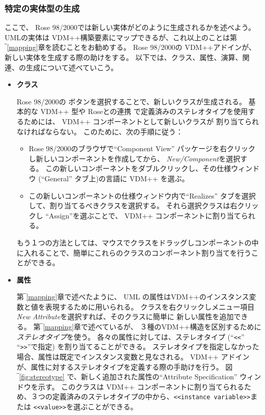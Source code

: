 \documentclass[\pformat,12pt]{jarticle}
\newcommand{\vdmpp}{VDM++}
\newcommand{\link}{Roseとの連携}
\newcommand{\rose}{Rose 98/2000}
\begin{document}
\subsubsection*{特定の実体型の生成}
  
ここで、 \rose{}では新しい実体がどのように生成されるかを述べよう。
UMLの実体は \vdmpp{}構築要素にマップできるが、これ以上のことは第‾\ref{mapping}章を読むことをお勧めする。
\rose{}の \vdmpp{}アドインが、新しい実体を生成する際の助けをする。
以下では、クラス、属性、演算、関連、の生成について述べていこう。

\begin{itemize}
\item{\bf クラス} 

\rose{}の ボタンを選択することで、新しいクラスが生成される。
基本的な \vdmpp{} 型や \link{} で定義済みのステレオタイプを使用するためには、 \vdmpp{} コンポーネントとして新しいクラスが 割り当てられなければならない。
このために、次の手順に従う：

  \begin{itemize}
  \item \rose{}のブラウザで``Component  View'' パッケージを右クリックし新しいコンポーネントを作成してから、 {\em  New/Component}を選択する。
この新しいコンポーネントをダブルクリックし、その仕様ウィンドウ (``General'' タブ上)の言語に \vdmpp{} を選ぶ。
  \item この新しいコンポーネントの仕様ウィンドウ内で``Realizes'' タブを選択して、割り当てるべきクラスを選択する。
それら選択クラスは右クリックし ``Assign''を選ぶことで、 \vdmpp{} コンポーネントに割り当てられる。
  \end{itemize}

もう１つの方法としては、マウスでクラスをドラッグしコンポーネントの中に入れることで、簡単にこれらのクラスのコンポーネント割り当てを行うことができる。

\item{\bf 属性}

 第‾\ref{mapping}章で述べたように、 UML の属性は\vdmpp{}のインスタンス変数と値を表現するために用いられる。
クラスを右クリックしメニュー項目{\it New Attribute}を選択すれば、そのクラスに簡単に 新しい属性を追加できる。 
 第‾\ref{mapping}章で述べているが、 ３種の\vdmpp{}構造を区別するために{\it ステレオタイプ}を使う。
各々の属性に対しては、ステレオタイプ (``{\tt <<}'' ``{\tt >>}''で指定) を割り当てることができる。
ステレオタイプを指定しなかった場合、属性は既定でインスタンス変数と見なされる。
 \vdmpp{} アドインが、属性に対するステレオタイプを定義する際の手助けを行う。
図‾\ref{fig:stereotype} で、新しく追加された属性の``Attribute  Specification'' ウィンドウを示す。
このクラスは \vdmpp{} コンポーネントに割り当てられるため、３つの定義済みのステレオタイプの中から、{\tt <<instance variable>>}または {\tt <<value>>}を選ぶことができる。


\end{itemize}
\end{document}
